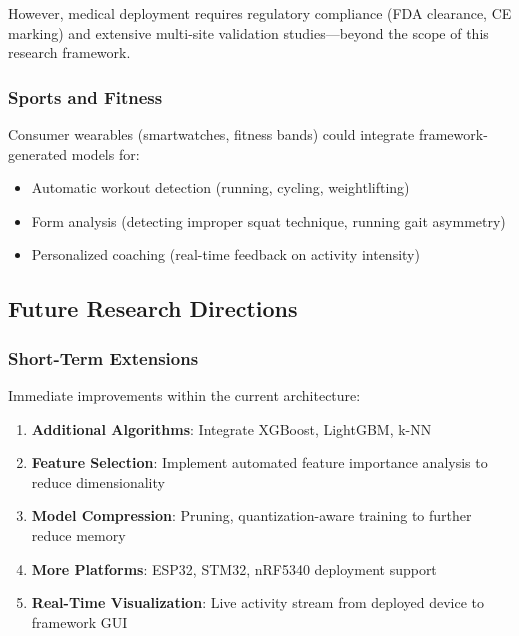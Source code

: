 However, medical deployment requires regulatory compliance (FDA clearance, CE marking) and extensive multi-site validation studies—beyond the scope of this research framework.

\subsubsection{Sports and Fitness}
Consumer wearables (smartwatches, fitness bands) could integrate framework-generated models for:
\begin{itemize}
    \item Automatic workout detection (running, cycling, weightlifting)
    \item Form analysis (detecting improper squat technique, running gait asymmetry)
    \item Personalized coaching (real-time feedback on activity intensity)
\end{itemize}

\subsection{Future Research Directions}

\subsubsection{Short-Term Extensions}
Immediate improvements within the current architecture:
\begin{enumerate}
    \item \textbf{Additional Algorithms}: Integrate XGBoost, LightGBM, k-NN
    \item \textbf{Feature Selection}: Implement automated feature importance analysis to reduce dimensionality
    \item \textbf{Model Compression}: Pruning, quantization-aware training to further reduce memory
    \item \textbf{More Platforms}: ESP32, STM32, nRF5340 deployment support
    \item \textbf{Real-Time Visualization}: Live activity stream from deployed device to framework GUI
\end{enumerate}

